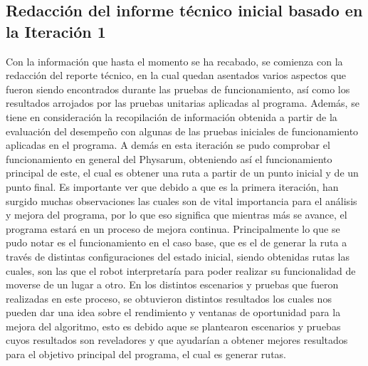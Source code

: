 \subsection{Redacci\'on del informe t\'ecnico inicial basado en la Iteraci\'on 1}
    Con la informaci\'on que hasta el momento se ha recabado, se
        comienza con la redacci\'on del reporte t\'ecnico, en la cual
        quedan asentados varios aspectos que fueron siendo
        encontrados durante las pruebas de funcionamiento, as\'i
        como los resultados arrojados por las pruebas unitarias
        aplicadas al programa.
        \vskip 0.5cm
    Adem\'as, se tiene en consideraci\'on la recopilaci\'on de
        informaci\'on obtenida a partir de la evaluaci\'on del
        desempe\~no con algunas de las pruebas iniciales de
        funcionamiento aplicadas en el programa.
        \vskip 0.5cm
    A dem\'as en esta iteraci\'on se pudo comprobar el funcionamiento en
        general del Physarum, obteniendo as\'i el funcionamiento
        principal de este, el cual es obtener una ruta a partir de un
        punto inicial y de un punto final. Es importante ver que
        debido a que es la primera iteraci\'on, han surgido muchas
        observaciones las cuales son de vital importancia para el
        an\'alisis y mejora del programa, por lo que eso significa que
        mientras m\'as se avance, el programa estar\'a en un proceso de
        mejora continua.
    \vskip 0.5cm
    Principalmente lo que se pudo notar es el funcionamiento en
        el caso base, que es el de generar la ruta a trav\'es de distintas
        configuraciones del estado inicial, siendo obtenidas rutas las
        cuales, son las que el robot interpretar\'ia para poder realizar
        su funcionalidad de moverse de un lugar a otro.
    \vskip 0.5cm
    En los distintos escenarios y pruebas que fueron realizadas
        en este proceso, se obtuvieron distintos resultados los cuales
        nos pueden dar una idea sobre el rendimiento y ventanas de
        oportunidad para la mejora del algoritmo, esto es debido aque se plantearon escenarios y pruebas cuyos resultados son
        reveladores y que ayudar\'ian a obtener mejores resultados
        para el objetivo principal del programa, el cual es generar
        rutas.
    \vskip 0.5cm